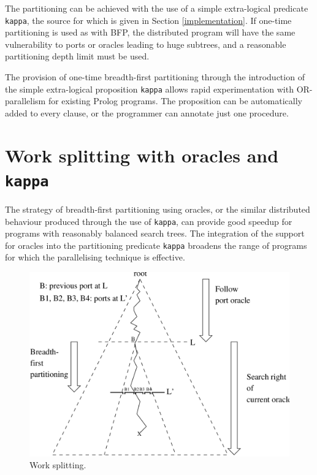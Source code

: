 \documentclass[a4paper,11pt,twoside]{article}
\begin{document}
The partitioning can be achieved with the use of a simple extra-logical
predicate \texttt{kappa}, the source for which is
given in Section \ref{implementation}.  If one-time
partitioning is used as with BFP, the distributed program will have the
same vulnerability to ports or oracles leading to huge subtrees,
and a reasonable partitioning depth limit must be used.

The provision of 
one-time breadth-first partitioning through the introduction of the simple
extra-logical proposition \texttt{kappa} allows rapid experimentation with
OR-parallelism for existing Prolog programs.  The proposition can be automatically
added to every clause, or the programmer can annotate just one procedure.

\section{Work splitting with oracles and \texttt{kappa}} %
\label{work_splitting}

The strategy of breadth-first partitioning using oracles, or the similar
distributed behaviour produced through the use of \texttt{kappa}, can provide
good speedup for programs with reasonably balanced search trees.
The integration of the support for oracles into the partitioning predicate
\texttt{kappa} broadens the range of programs for which the parallelising
technique is effective.

\begin{figure}
  \includegraphics[width=\linewidth]{sok.png}
  \caption{Work splitting.}
  \label{sok}
\end{figure}
\end{document}
